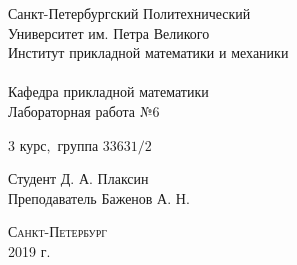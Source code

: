 \documentclass[a4]{article}
\begin{document}



\def\contentsname{\LARGE{Содержание}}
\thispagestyle{empty}
\begin{center} 
\vspace{2cm} 
{\Large \sc Санкт-Петербургский Политехнический}\\
\vspace{2mm}
{\Large \sc Университет} им. {\Large\sc Петра Великого}\\
\vspace{1cm}
{\large \sc Институт прикладной математики и механики\\ 
\vspace{0.5mm}
\textsc{}}\\ 
\vspace{0.5mm}
{\large\sc Кафедра прикладной математики}\\
\vspace{15mm}
{\huge \sc Лабораторная работа №$6$\\
\vspace{6mm}
 }
\vspace*{2mm}
\vspace{1cm}

{\sc $3$ курс$,$ группа $33631/2$}

\vspace{2cm} 
Студент \hfill Д. А. Плаксин\\
\vspace{1cm}
Преподаватель \hfill Баженов А. Н.\\
\vspace{20mm} 

\end{center} 
\begin{center}
\vfill {\large\textsc{Санкт-Петербург}}\\ 
2019 г.
\end{center}

\end{document}
